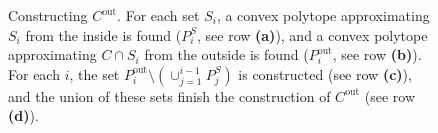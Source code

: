 \documentclass[final,12pt]{colt2018}
\newtheorem{informal theorem}[theorem]{Theorem (informal statement)}
\newcommand{\pouti}{P^{\mathrm{out}}_i}
\newcommand{\cout}{C^\mathrm{out}}
\begin{document}
\begin{figure}
\begin{center}
\caption{Constructing $\cout$. For each set $S_i$, a convex polytope approximating $S_i$ from the inside is found ($P^S_i$, see row \textbf{(a)}), and a convex polytope approximating $C \cap S_i$ from the outside is found ($\pouti$, see row \textbf{(b)}). For each $i$, the set $\pouti \setminus (\cup_{j = 1}^{i-1} P^S_j)$ is constructed (see row \textbf{(c)}), and the union of these sets finish the construction of $
\cout$ (see row \textbf{(d)}).}
\label{fig:c_out}
\end{center}
\end{figure}
\end{document}
